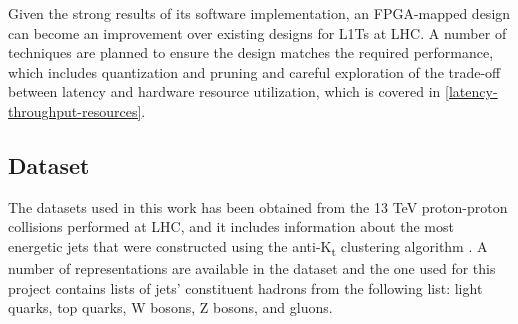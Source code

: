 Given the strong results of its software implementation, an FPGA-mapped design can become an improvement over existing designs for L1Ts at LHC. A number of techniques are planned to ensure the design matches the required performance, which includes quantization and pruning \cite{45-liang2021pruning} and careful exploration of the trade-off between latency and hardware resource utilization, which is covered in \autoref{latency-throughput-resources}.


\subsection{Dataset}
The datasets used in this work has been obtained from the 13 TeV proton-proton collisions performed at LHC, and it includes information about the most energetic jets \cite{31-pierinihls4ml,32-pierinihls4ml,33-pierinihls4ml,34-pierinihls4ml} that were constructed using the anti-K\textsubscript{t} clustering algorithm \cite{35-cacciari2008anti-kt}. A number of representations are available in the dataset and the one used for this project contains lists of jets' constituent hadrons from the following list: light quarks, top quarks, W bosons, Z bosons, and gluons.


